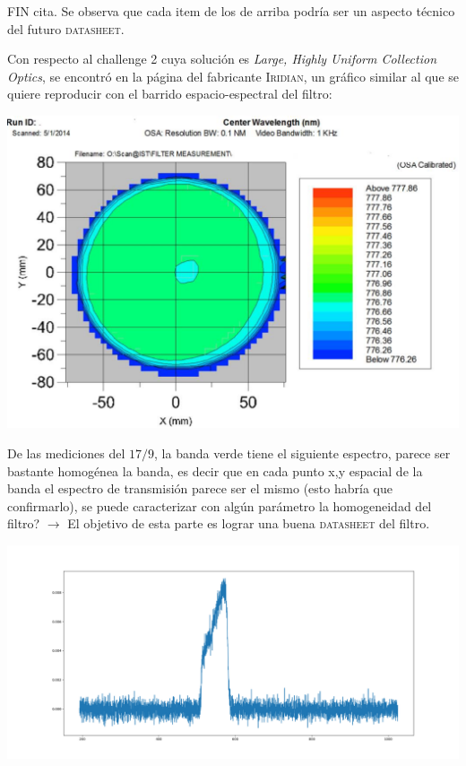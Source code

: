 \documentclass[12pt,dvipsnames]{exam}
\begin{document}
FIN cita. Se observa que cada item de los de arriba podría ser un aspecto técnico del futuro \textsc{datasheet}.


Con respecto al challenge 2 cuya solución es \textit{Large, Highly Uniform Collection Optics}, se encontró en la página del fabricante \textsc{Iridian}, un gráfico similar al que se quiere reproducir con el barrido espacio-espectral del filtro: 

\begin{center}
	\includegraphics[scale=1.0]{imgs/barr_iridian.png}
\end{center}


De las mediciones del $17/9$, la banda verde tiene el siguiente espectro, parece ser bastante homogénea la banda, es decir que en cada punto x,y espacial de la banda el espectro de transmisión parece ser el mismo (esto habría que confirmarlo), se puede caracterizar con algún parámetro la homogeneidad del filtro? $\xrightarrow{}$ El objetivo de esta parte es lograr una buena \textsc{datasheet} del filtro.

\begin{center}
	\includegraphics[scale=0.4]{imgs/green_band_spectra.png}
\end{center}
\end{document}
